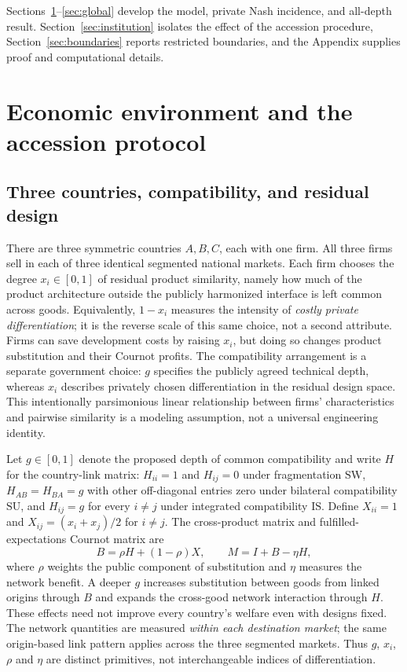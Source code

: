 \documentclass[11pt,a4paper]{article}
\theoremstyle{remark}\newtheorem{remark}[theorem]{Remark}
\newcommand{\SW}{\mathrm{SW}}\newcommand{\SU}{\mathrm{SU}}\newcommand{\IS}{\mathrm{IS}}
\begin{document}
Sections~\ref{sec:model}--\ref{sec:global} develop the model, private Nash incidence, and all-depth result. Section~\ref{sec:institution} isolates the effect of the accession procedure, Section~\ref{sec:boundaries} reports restricted boundaries, and the Appendix supplies proof and computational details.

\section{Economic environment and the accession protocol}\label{sec:model}
\subsection{Three countries, compatibility, and residual design}
There are three symmetric countries $A,B,C$, each with one firm. All three firms sell in each of three identical segmented national markets. Each firm chooses the degree $x_i\in[0,1]$ of residual product similarity, namely how much of the product architecture outside the publicly harmonized interface is left common across goods. Equivalently, $1-x_i$ measures the intensity of \emph{costly private differentiation}; it is the reverse scale of this same choice, not a second attribute. Firms can save development costs by raising $x_i$, but doing so changes product substitution and their Cournot profits. The compatibility arrangement is a separate government choice: $g$ specifies the publicly agreed technical depth, whereas $x_i$ describes privately chosen differentiation in the residual design space. This intentionally parsimonious linear relationship between firms' characteristics and pairwise similarity is a modeling assumption, not a universal engineering identity.

Let $g\in[0,1]$ denote the proposed depth of common compatibility and write $H$ for the country-link matrix: $H_{ii}=1$ and $H_{ij}=0$ under fragmentation $\SW$, $H_{AB}=H_{BA}=g$ with other off-diagonal entries zero under bilateral compatibility $\SU$, and $H_{ij}=g$ for every $i\ne j$ under integrated compatibility $\IS$. Define $X_{ii}=1$ and $X_{ij}=(x_i+x_j)/2$ for $i\ne j$. The cross-product matrix and fulfilled-expectations Cournot matrix are
\begin{equation}\label{eq:matrices}
B=\rho H+(1-\rho)X,\qquad M=I+B-\eta H,
\end{equation}
where $\rho$ weights the public component of substitution and $\eta$ measures the network benefit. A deeper $g$ increases substitution between goods from linked origins through $B$ and expands the cross-good network interaction through $H$. These effects need not improve every country's welfare even with designs fixed. The network quantities are measured \emph{within each destination market}; the same origin-based link pattern applies across the three segmented markets. Thus $g$, $x_i$, $\rho$ and $\eta$ are distinct primitives, not interchangeable indices of differentiation.
\end{document}
